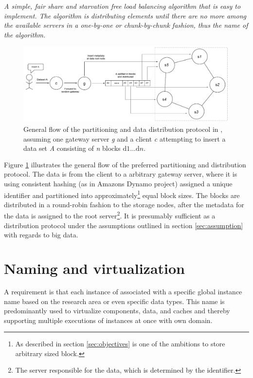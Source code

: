 \begin{definition} \label{def:rr}
\textit{A simple, fair share and starvation free load balancing algorithm that is easy to implement. The algorithm is distributing elements until there are no more among the available servers in a one-by-one or chunk-by-chunk fashion, thus the name of the algorithm.}
\end{definition}
\vspace*{3mm}

\begin{figure}[h!]
	\centering
	\includegraphics[scale=0.5]{pdf/rr-partitioning.pdf}
	\caption[Overview of the partitioning and data distribution protocol]{General flow of the partitioning and data distribution protocol in \CodeName, assuming one gateway server \textit{g} and a client \textit{c} attempting to insert a data set \textit{A} consisting of \textit{n} blocks $\text{d}1 \ldots \text{d}n$.\label{fig:rr-partitioning}}
\end{figure}

\vspace*{3mm}
Figure \ref{fig:rr-partitioning} illustrates the general flow of the preferred partitioning and distribution protocol. The data is from the client to a arbitrary gateway server, where it is using consistent hashing (as in Amazons Dynamo project) assigned a unique identifier and partitioned into approximately\footnote{As described in section \ref{sec:objectives} is one of the ambitions to store arbitrary sized block.} equal block sizes. The blocks are distributed in a round-robin fashion to the storage nodes, after the metadata for the data is assigned to the root server\footnote{The server responsible for the data, which is determined by the identifier.}. It is presumably sufficient as a distribution protocol under the assumptions outlined in section \ref{sec:assumption} with regards to big data.

\section{Naming and virtualization}
A requirement is that each instance of \CodeNameFull associated with a specific global instance name \eg based on the research area or even specific data types. This name is predominantly used to virtualize components, data, and caches and thereby supporting multiple executions of \CodeName instances at once with own domain.
\newline

